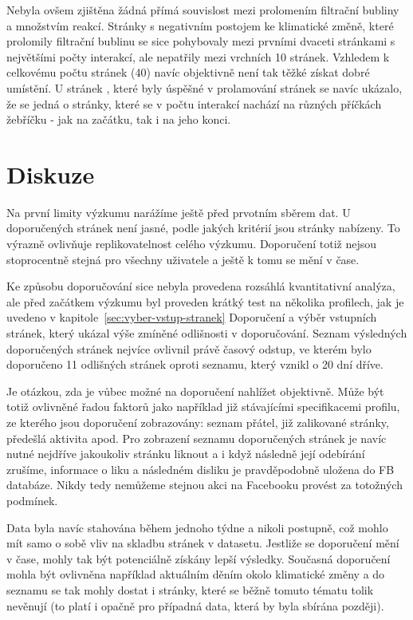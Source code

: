 Nebyla ovšem zjištěna žádná přímá souvislost mezi prolomením filtrační bubliny a množstvím reakcí. Stránky s negativním postojem ke klimatické změně, které prolomily filtrační bublinu se sice pohybovaly mezi prvními dvaceti stránkami s největšími počty interakcí, ale nepatřily mezi vrchních 10 stránek. Vzhledem k celkovému počtu stránek  (40) navíc objektivně není tak těžké získat dobré umístění. U stránek , které byly úspěšné v prolamování stránek  se navíc ukázalo, že se jedná o stránky, které se v počtu interakcí nachází na různých příčkách žebříčku - jak na začátku, tak i na jeho konci. 
     
\section{Diskuze}
\label{sec:limity-doporuceni}
    Na první limity výzkumu narážíme ještě před prvotním sběrem dat. U doporučených stránek není jasné, podle jakých kritérií jsou stránky nabízeny. To výrazně ovlivňuje replikovatelnost celého výzkumu. Doporučení totiž nejsou stoprocentně stejná pro všechny uživatele a ještě k tomu se mění v čase. 
    
    Ke způsobu doporučování sice nebyla provedena rozsáhlá kvantitativní analý\-za, ale před začátkem výzkumu byl proveden krátký test na několika profilech, jak je uvedeno v kapitole~\ref{sec:vyber-vstup-stranek} Doporučení a výběr vstupních stránek, který ukázal výše zmíněné odlišnosti v doporučování. Seznam výsledných doporučených stránek nejvíce ovlivnil právě časový odstup, ve kterém bylo doporučeno 11 odlišných stránek oproti seznamu, který vznikl o 20 dní dříve. 
    
    Je otázkou, zda je vůbec možné na doporučení nahlížet objektivně. Může být totiž ovlivněné řadou faktorů jako například již stávajícími specifikacemi profilu, ze kterého jsou doporučení zobrazovány: seznam přátel, již zalikované stránky, předešlá aktivita apod. Pro zobrazení seznamu doporučených stránek je navíc nutné nejdříve jakoukoliv stránku liknout a i když následně její odebírání zrušíme, informace o liku a následném disliku je pravděpodobně uložena do FB databáze. Nikdy tedy nemůžeme stejnou akci na Facebooku provést za totožných podmínek. 
    
    Data byla navíc stahována během jednoho týdne a nikoli postupně, což mohlo mít samo o sobě vliv na skladbu stránek v datasetu. Jestliže se doporučení mění v čase, mohly tak být potenciálně získány lepší výsledky. Současná doporučení mohla být ovlivněna například aktuálním děním okolo klimatické změny a do seznamu se tak mohly dostat i stránky, které se běžně tomuto tématu tolik nevěnují (to platí i opačně pro případná data, která by byla sbírána později). 
    

